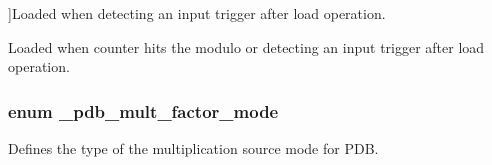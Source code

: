 \begin{Desc}
\begin{description}
{}]Loaded when detecting an input trigger after load operation. \item[{\em 
k\+Pdb\+Load\+At\+Modulo\+Counter\+Or\+Next\+Trigger\hypertarget{group__pdb__hal_gga24cd30e248ca866cb85a353b2c69ac65a4f31f7acd4f40c22fcb37911906c62d3}{}\label{group__pdb__hal_gga24cd30e248ca866cb85a353b2c69ac65a4f31f7acd4f40c22fcb37911906c62d3}
}]Loaded when counter hits the modulo or detecting an input trigger after load operation. \end{description}
\end{Desc}
\subsubsection[{\texorpdfstring{\+\_\+pdb\+\_\+mult\+\_\+factor\+\_\+mode}{_pdb_mult_factor_mode}}]{\setlength{\rightskip}{0pt plus 5cm}enum {\bf \+\_\+pdb\+\_\+mult\+\_\+factor\+\_\+mode}}\hypertarget{group__pdb__hal_gae87b5a0cf111784453bd0090c1a05254}{}\label{group__pdb__hal_gae87b5a0cf111784453bd0090c1a05254}


Defines the type of the multiplication source mode for P\+DB. 

